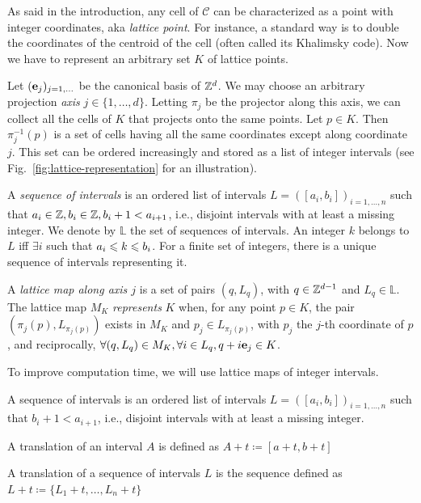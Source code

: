 As said in the introduction, any cell of $\mathcal{C}$ can be
characterized as a point with integer coordinates, aka \emph{lattice
point}. For instance, a standard way is to double the coordinates of
the centroid of the cell (often called its Khalimsky code). Now we
have to represent an arbitrary set $K$ of lattice points.

Let $(\mathbf{e}_j)_{j=1,\dots}$ be the canonical basis of $\mathbb{Z}^d$.  We may
choose an arbitrary projection \emph{axis} $j \in
\{1,\ldots,d\}$. Letting $\pi_j$ be the projector along this axis, we
can collect all the cells of $K$ that projects onto the same
points. Let $p \in K$. Then $\pi^{-1}_j(p)$ is a set of cells having
all the same coordinates except along coordinate $j$. This set can be
ordered increasingly and stored as a list of integer intervals (see
Fig.~\ref{fig:lattice-representation} for an illustration).

A \emph{sequence of intervals} is an ordered list of intervals $L =
([a_i,b_i])_{i=1,\ldots,n}$ such that $a_i \in \mathbb{Z}, b_i \in \mathbb{Z}, b_i + 1
< a_{i+1}$, i.e., disjoint intervals with at least a missing
integer. We denote by $\mathbb{L}$ the set of sequences of
intervals. An integer $k$ belongs to $L$ iff $\exists i$ such that
$a_i \leqslant k \leqslant b_i$. For a finite set of integers, there is a unique
sequence of intervals representing it.

A \emph{lattice map along axis $j$} is a set of pairs $(q,L_q)$, with
$q \in \mathbb{Z}^{d-1}$ and $L_q \in \mathbb{L}$. The lattice map $M_K$
\emph{represents} $K$ when, for any point $p \in K$, the pair
$(\pi_j(p), L_{\pi_j(p)})$ exists in $M_K$ and $p_j \in L_{\pi_j(p)}$,
with $p_j$ the $j$-th coordinate of $p$, and reciprocally, $\forall
(q,L_q) \in M_K, \forall i \in L_q, q+i\mathbf{e}_j \in K$.


To improve computation time, we will use lattice maps of integer
intervals.

\begin{definition}
  A sequence of intervals is an ordered list of intervals $L = ([a_i,b_i])_{i=1,\ldots,n}$ such that $b_i + 1 < a_{i+1}$, i.e., disjoint intervals with at least a missing integer.
\end{definition}

\begin{definition}
  A translation of an interval $A$ is defined as $A+t \coloneqq [a+t, b+t]$
\end{definition}

\begin{definition}
  A translation of a sequence of intervals $L$ is the sequence defined as $L+t \coloneqq \{L_1+t,\ldots,L_n+t\}$
\end{definition}

